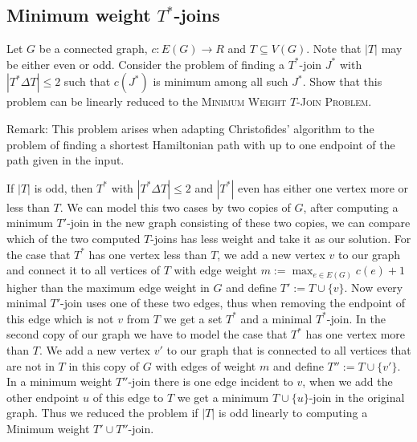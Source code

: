 \documentclass{article}
\begin{document}
  \subsection{Minimum weight $T^*$-joins}
  \begin{centerframebox}
    Let $G$ be a connected graph, $c : E(G) \to R$ and $T \subseteq V (G)$.
    Note that $|T|$ may be either even or odd.
    Consider the problem of finding a $T^*$-join $J^*$ with $|T^* \Delta T| \leq 2$ such that $c(J^*)$ is minimum among all such $J^*$.
    Show that this problem can be linearly reduced to the \textsc{Minimum Weight $T$-Join Problem}.

    Remark: This problem arises when adapting Christofides' algorithm to the problem
    of finding a shortest Hamiltonian path with up to one endpoint of the path given
    in the input.
  \end{centerframebox}
  If $|T|$ is odd, then $T^*$ with $|T^*\Delta T|\leq 2$ and $|T^*|$ even has either one vertex more or less than $T$. We can model this two cases by two copies of $G$, after computing a minimum $T'$-join in the new graph consisting of these two copies, we can compare which of the two computed $T$-joins has less weight and take it as our solution. For the case that $T^*$ has one vertex less than $T$, we add a new vertex $v$ to our graph and connect it to all vertices of $T$ with edge weight $m:=\max_{e\in E(G)}c(e)+1$ higher than the maximum edge weight in $G$ and define $T':=T\cup\{v\}$. Now every minimal $T'$-join uses one of these two edges, thus when removing the endpoint of this edge which is not $v$ from $T$ we get a set $T^*$ and a minimal $T^*$-join. In the second copy of our graph we have to model the case that $T^*$ has one vertex more than $T$. We add a new vertex $v'$ to our graph that is connected to all vertices that are not in $T$ in this copy of $G$ with edges of weight $m$ and define $T'':=T\cup\{v'\}$. In a minimum weight $T''$-join there is one edge incident to $v$, when we add the other endpoint $u$ of this edge to $T$ we get a minimum $T\cup\{u\}$-join in the original graph. Thus we reduced the problem if $|T|$ is odd linearly to computing a Minimum weight $T'\cup T''$-join.
\end{document}
